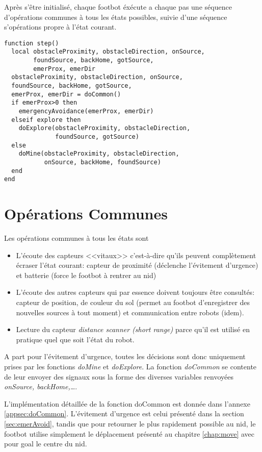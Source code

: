 Après s'être initialisé, chaque footbot éxécute a chaque pas une séquence d'opérations communes à tous les états possibles, suivie d'une séquence s'opérations propre à l'état courant.
\begin{lstlisting}[caption=Fonction step]
function step()
  local obstacleProximity, obstacleDirection, onSource,
        foundSource, backHome, gotSource,
        emerProx, emerDir
  obstacleProximity, obstacleDirection, onSource,
  foundSource, backHome, gotSource,
  emerProx, emerDir = doCommon()
  if emerProx>0 then
    emergencyAvoidance(emerProx, emerDir)
  elseif explore then
    doExplore(obstacleProximity, obstacleDirection,
              foundSource, gotSource)
  else
    doMine(obstacleProximity, obstacleDirection,
           onSource, backHome, foundSource)
  end
end
\end{lstlisting}

\section{Opérations Communes}

Les opérations communes à tous les états sont
\begin{itemize}
  \item L'écoute des capteurs <<vitaux>> c'est-à-dire qu'ils peuvent complètement écraser l'état courant: capteur de proximité (déclenche l'évitement d'urgence) et batterie (force le footbot à rentrer au nid)
  \item L'écoute des autres capteurs qui par essence doivent toujours être consultés: capteur de position, de couleur du sol (permet au footbot d'enregistrer des nouvelles sources à tout moment) et communication entre robots (idem).
  \item Lecture du capteur \emph{distance scanner (short range)} parce qu'il est utilisé en pratique quel que soit l'état du robot.
\end{itemize}

A part pour l'évitement d'urgence, toutes les décisions sont donc uniquement prises par les fonctions \emph{doMine} et \emph{doExplore}. La fonction \emph{doCommon} se contente de leur envoyer des signaux sous la forme des diverses variables renvoyées \emph{onSource, backHome,\ldots}.

L'implémentation détaillée de la fonction doCommon est donnée dans l'annexe \ref{appsec:doCommon}. L'évitement d'urgence est celui présenté dans la section \ref{sec:emerAvoid}, tandis que pour retourner le plus rapidement possible au nid, le footbot utilise simplement le déplacement présenté au chapitre \ref{chap:move} avec pour goal le centre du nid.

